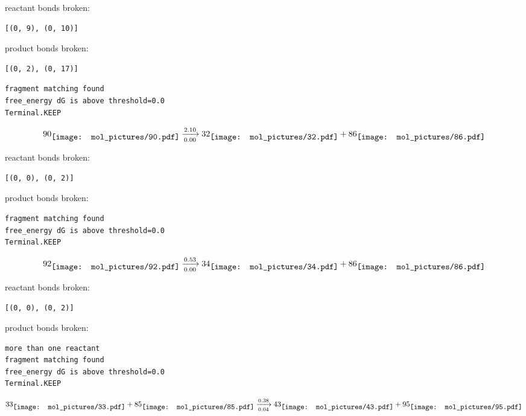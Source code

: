 \documentclass{article}
\begin{document}
reactant bonds broken:\begin{verbatim}
[(0, 9), (0, 10)]
\end{verbatim}
product bonds broken:\begin{verbatim}
[(0, 2), (0, 17)]
\end{verbatim}




\vspace{1cm}
\begin{verbatim}
fragment matching found
free_energy dG is above threshold=0.0
Terminal.KEEP
\end{verbatim}
$$
90
\raisebox{-.5\height}{\texttt{[image: mol\_pictures/90.pdf]}}
\xrightarrow[0.00]{2.10}
32
\raisebox{-.5\height}{\texttt{[image: mol\_pictures/32.pdf]}}
+
86
\raisebox{-.5\height}{\texttt{[image: mol\_pictures/86.pdf]}}
$$


reactant bonds broken:\begin{verbatim}
[(0, 0), (0, 2)]
\end{verbatim}
product bonds broken:



\vspace{1cm}
\begin{verbatim}
fragment matching found
free_energy dG is above threshold=0.0
Terminal.KEEP
\end{verbatim}
$$
92
\raisebox{-.5\height}{\texttt{[image: mol\_pictures/92.pdf]}}
\xrightarrow[0.00]{0.53}
34
\raisebox{-.5\height}{\texttt{[image: mol\_pictures/34.pdf]}}
+
86
\raisebox{-.5\height}{\texttt{[image: mol\_pictures/86.pdf]}}
$$


reactant bonds broken:\begin{verbatim}
[(0, 0), (0, 2)]
\end{verbatim}
product bonds broken:



\vspace{1cm}
\begin{verbatim}
more than one reactant
fragment matching found
free_energy dG is above threshold=0.0
Terminal.KEEP
\end{verbatim}
$$
33
\raisebox{-.5\height}{\texttt{[image: mol\_pictures/33.pdf]}}
+
85
\raisebox{-.5\height}{\texttt{[image: mol\_pictures/85.pdf]}}
\xrightarrow[0.04]{0.38}
43
\raisebox{-.5\height}{\texttt{[image: mol\_pictures/43.pdf]}}
+
95
\raisebox{-.5\height}{\texttt{[image: mol\_pictures/95.pdf]}}
$$
\end{document}
